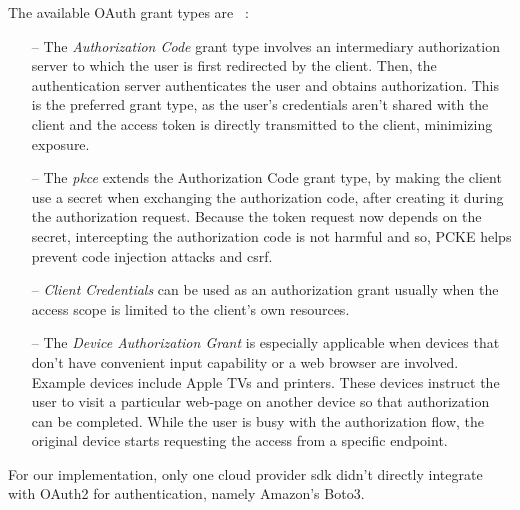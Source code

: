 The available OAuth grant types are ~\cite{oauth, oauth_grants}:

\begin{itemize}
    \item [--]The \textit{Authorization Code} grant type involves an intermediary authorization server to which the user is first redirected by the client. Then, the authentication server authenticates the user and obtains authorization. This is the preferred grant type, as the user's credentials aren't shared with the client and the access token is directly transmitted to the client, minimizing exposure.

    \item [--] The \textit{\ac{pkce}} extends the Authorization Code grant type, by making the client use a secret when exchanging the authorization code, after creating it during the authorization request. Because the token request now depends on the secret, intercepting the authorization code is not harmful and so, PCKE helps prevent code injection attacks and \ac{csrf}.

    \item [--] \textit{Client Credentials} can be used as an authorization grant usually when the access scope is limited to the client's own resources.

    \item [--] The \textit{Device Authorization Grant} is especially applicable when devices that don't have convenient input capability or a web browser are involved. Example devices include Apple TVs and printers. These devices instruct the user to visit a particular web-page on another device so that authorization can be completed. While the user is busy with the authorization flow, the original device starts requesting the access from a specific endpoint.
\end{itemize}

For our implementation, only one cloud provider \ac{sdk} didn't directly integrate with OAuth2 for authentication, namely Amazon's Boto3.
